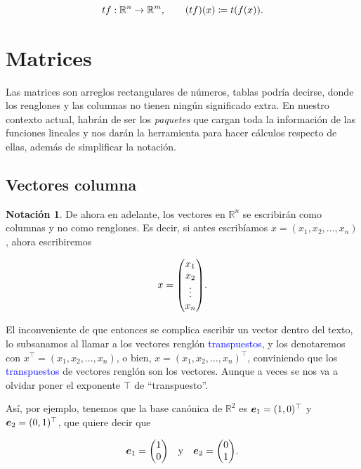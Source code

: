 \documentclass{article}
\theoremstyle{definicion}
\theoremstyle{definition}             %
\theoremstyle{definition}             %
\theoremstyle{definition}
\theoremstyle{definition}
\theoremstyle{observacion}
\theoremstyle{definition}
\theoremstyle{plain}
\theoremstyle{definition}
\theoremstyle{afirmacion}
\theoremstyle{notation}
\newtheorem{notation}{Notación}
\theoremstyle{definition}
\begin{document}
    \begin{equation*}
        tf \ordinarycolon \mathbb{R}^{n} \to \mathbb{R}^{m}, \qquad (tf)(x) \coloneq t(f(x)).
    \end{equation*}

    \section{Matrices}

    Las matrices son arreglos rectangulares de números, tablas podría decirse, donde los renglones y las columnas no tienen ningún significado extra. En nuestro contexto actual, habrán de ser los \emph{paquetes} que cargan toda la información de las funciones lineales y nos darán la herramienta para hacer cálculos respecto de ellas, además de simplificar la notación.

    \subsection{Vectores columna}

    \begin{notation}
        De ahora en adelante, los vectores en \(\mathbb{R}^{n}\) se escribirán como columnas y no como renglones. Es decir, si antes escribíamos \(x = (x_{1}, x_{2}, \dots, x_{n})\), ahora escribiremos

        \begin{equation*}
            x = \mqty(x_{1}\\ x_{2}\\ \vdots \\ x_{n}).
        \end{equation*}

        El inconveniente de que entonces se complica escribir un vector dentro del texto, lo subsanamos al llamar a los vectores renglón \textcolor{blue}{transpuestos}, y los denotaremos con \(x^{\top} = (x_{1}, x_{2}, \dots, x_{n})\), o bien, \(x = (x_{1}, x_{2}, \dots, x_{n})^{\top}\), conviniendo que los \textcolor{blue}{transpuestos} de vectores renglón son los vectores. Aunque a veces se nos va a olvidar poner el exponente \(\top\) de ``transpuesto''.

        Así, por ejemplo, tenemos que la base canónica de \(\mathbb{R}^{2}\) es \(\vb*{e}_{1} = (1, 0)^{\top}\) y \(\vb*{e}_{2} = (0, 1)^{\top}\), que quiere decir que

        \begin{equation*}
            \vb*{e}_{1} = \mqty(1 \\ 0) \quad \text{y} \quad \vb*{e}_{2} = \mqty(0 \\ 1).
        \end{equation*}
    \end{notation}
\end{document}
